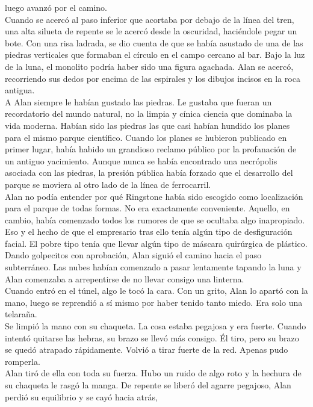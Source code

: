 {luego avanzó por el camino.\\
Cuando se acercó al paso inferior que acortaba por debajo de la línea
del tren, una alta silueta de repente se le acercó desde la oscuridad,
haciéndole pegar un bote. Con una risa ladrada, se dio cuenta de que se
había asustado de una de las piedras verticales que formaban el círculo
en el campo cercano al bar. Bajo la luz de la luna, el monolito podría
haber sido una figura agachada. Alan se acercó, recorriendo sus dedos
por encima de las espirales y los dibujos incisos en la roca antigua.\\
A Alan siempre le habían gustado las piedras. Le gustaba que fueran un
recordatorio del mundo natural, no la limpia y cínica ciencia que
dominaba la vida moderna. Habían sido las piedras las que casi habían
hundido los planes para el mismo parque científico. Cuando los planes se
hubieron publicado en primer lugar, había habido un grandioso reclamo
público por la profanación de un antiguo yacimiento. Aunque nunca se
había encontrado una necrópolis asociada con las piedras, la presión
pública había forzado que el desarrollo del parque se moviera al otro
lado de la línea de ferrocarril.\\
Alan no podía entender por qué Ringstone había sido escogido como
localización para el parque de todas formas. No era exactamente
conveniente. Aquello, en cambio, había comenzado todos los rumores de
que se ocultaba algo inapropiado. Eso y el hecho de que el empresario
tras ello tenía algún tipo de desfiguración facial. El pobre tipo tenía
que llevar algún tipo de máscara quirúrgica de plástico.\\
Dando golpecitos con aprobación, Alan siguió el camino hacia el paso
subterráneo. Las nubes habían comenzado a pasar lentamente tapando la
luna y Alan comenzaba a arrepentirse de no llevar consigo una
linterna.\\
Cuando entró en el túnel, algo le tocó la cara. Con un grito, Alan lo
apartó con la mano, luego se reprendió a sí mismo por haber tenido tanto
miedo. Era solo una telaraña.\\
Se limpió la mano con su chaqueta. La cosa estaba pegajosa y era fuerte.
Cuando intentó quitarse las hebras, su brazo se llevó más consigo. Él
tiro, pero su brazo se quedó atrapado rápidamente. Volvió a tirar fuerte
de la red. Apenas pudo romperla.\\
Alan tiró de ella con toda su fuerza. Hubo un ruido de algo roto y la
hechura de su chaqueta le rasgó la manga. De repente se liberó del
agarre pegajoso, Alan perdió su equilibrio y se cayó hacia atrás,
}
